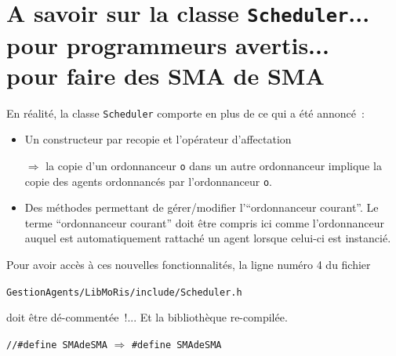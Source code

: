 \documentclass[12pt]{article}
\begin{document}
\newpage

\section{A savoir sur la classe {\tt Scheduler}...\\
pour programmeurs avertis...\\
pour faire des SMA de SMA}

En r\'ealit\'e, la classe {\tt Scheduler} comporte en plus de ce qui
a \'et\'e annonc\'e~:
\begin{itemize}
\item Un constructeur par recopie et l'op\'erateur d'affectation

$\Longrightarrow$ la copie d'un ordonnanceur {\tt o} dans un autre
ordonnanceur implique la copie des agents ordonnanc\'es par
l'ordonnanceur {\tt o}.

\item Des m\'ethodes permettant de g\'erer/modifier
l'``ordonnanceur courant''.
Le terme ``ordonnanceur courant'' doit \^etre compris ici comme
l'ordonnanceur auquel est automatiquement rattach\'e un agent lorsque
celui-ci est instanci\'e.
\end{itemize}

\noindent
Pour avoir acc\`es \`a ces nouvelles fonctionnalit\'es,
la ligne num\'ero 4 du fichier
\begin{center}
{\tt GestionAgents/LibMoRis/include/Scheduler.h}
\end{center}
doit \^etre d\'e-comment\'ee~!... Et la biblioth\`eque
re-compil\'ee.

\begin{center}
{\tt //\#define SMAdeSMA} $\Longrightarrow$ {\tt \#define SMAdeSMA}
\end{center}
\end{document}
